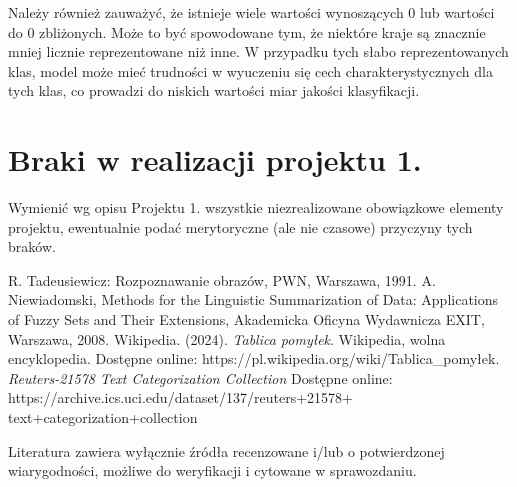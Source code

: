 \documentclass{article}
\begin{document}
\noindent Należy również zauważyć, że istnieje wiele wartości wynoszących 0 lub wartości do 0 zbliżonych. Może to być spowodowane tym, że niektóre kraje są znacznie mniej licznie reprezentowane niż inne. W przypadku tych słabo reprezentowanych klas, model może mieć trudności w wyuczeniu się cech charakterystycznych dla tych klas, co prowadzi do niskich wartości miar jakości klasyfikacji. \\



\section{Braki w realizacji projektu 1.}
Wymienić wg opisu Projektu 1. wszystkie niezrealizowane obowiązkowe elementy projektu, ewentualnie
podać merytoryczne (ale nie czasowe) przyczyny tych braków. 


\begin{thebibliography}{0}
 R. Tadeusiewicz: Rozpoznawanie obrazów, PWN, Warszawa, 1991.  
 A. Niewiadomski, Methods for the Linguistic Summarization of Data: Applications of Fuzzy Sets and Their Extensions, Akademicka Oficyna Wydawnicza EXIT, Warszawa, 2008.
 Wikipedia. (2024). \emph{Tablica pomyłek}. Wikipedia, wolna encyklopedia. Dostępne online: https://pl.wikipedia.org/wiki/Tablica\_pomyłek.
 \emph{Reuters-21578 Text Categorization Collection} Dostępne online: https://archive.ics.uci.edu/dataset/137/reuters+21578+\\text+categorization+collection
\end{thebibliography}

Literatura zawiera wyłącznie źródła recenzowane i/lub o potwierdzonej wiarygodności,
możliwe do weryfikacji i cytowane w sprawozdaniu. 
\end{document}
